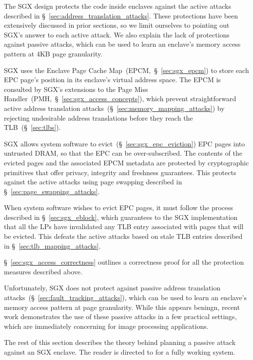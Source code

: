 The SGX design protects the code inside enclaves against the active attacks
described in \S~\ref{sec:address_translation_attacks}. These protections have
been extensively discussed in prior sections, so we limit ourselves to
pointing out SGX's answer to each active attack. We also explain the lack of
protections against passive attacks, which can be used to learn an enclave's
memory access pattern at 4KB page granularity.

SGX uses the Enclave Page Cache Map~(EPCM,~\S~\ref{sec:sgx_epcm}) to store each
EPC page's position in its enclave's virtual address space. The EPCM is
consulted by SGX's extensions to the Page Miss
Handler~(PMH,~\S~\ref{sec:sgx_access_concepts}), which prevent straightforward
active address translation attacks~(\S~\ref{sec:memory_mapping_attacks}) by
rejecting undesirable address translations before they reach the
TLB~(\S~\ref{sec:tlbs}).

SGX allows system software to evict~(\S~\ref{sec:sgx_epc_eviction}) EPC pages
into untrusted DRAM, so that the EPC can be over-subscribed. The contents of
the evicted pages and the associated EPCM metadata are protected by
cryptographic primitives that offer privacy, integrity and freshness
guarantees. This protects against the active attacks using page swapping
described in \S~\ref{sec:page_swapping_attacks}.

When system software wishes to evict EPC pages, it must follow the process
described in \S~\ref{sec:sgx_eblock}, which guarantees to the SGX
implementation that all the LPs have invalidated any TLB entry associated with
pages that will be evicted. This defeats the active attacks based on stale TLB
entries described in \S~\ref{sec:tlb_mapping_attacks}.

\S~\ref{sec:sgx_access_correctness} outlines a correctness proof for all the
protection measures described above.

Unfortunately, SGX does not protect against passive address translation
attacks~(\S~\ref{sec:fault_tracking_attacks}), which can be used to learn an
enclave's memory access pattern at page granularity. While this appears
beningn, recent work \cite{xu2015pagefaults} demonstrates the use of these
passive attacks in a few practical settings, which are immediately concerning
for image processing applications.

The rest of this section describes the theory behind planning a passive attack
against an SGX enclave. The reader is directed to \cite{xu2015pagefaults} for
a fully working system.

